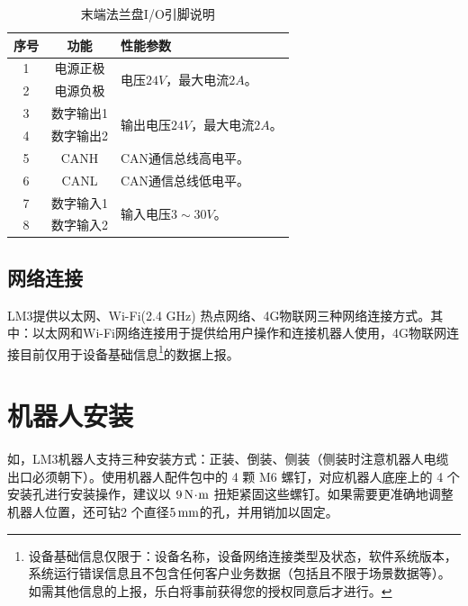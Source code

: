 \begin{enumerate}
\begin{table}[ht]
    \centering\small
\begin{tabular}{|c|c|l|}\hline
   \sf 序号	&  \sf 功能	& \sf  性能参数\\\hline
    1	&   电源正极   &  \multirow{2}{5cm}{
            电压$24\unit{V}$，最大电流$2\unit{A}$。
    }\\\cline{1-2}
    2	&   电源负极 & \\\hline
    3	&   数字输出1	&   \multirow{2}{5cm}{输出电压$24\unit{V}$，最大电流$2\unit{A}$。}\\\cline{1-2}
    4	&   数字输出2	&   \\\hline
    5	&   CANH	&  CAN通信总线高电平。 \\\hline
    6	&   CANL	& CAN通信总线低电平。  \\\hline
    7	&   数字输入1	&   \multirow{2}{5cm}{
            输入电压$3\sim 30\unit{V}$。
    }\\\cline{1-2}
    8	&   数字输入2	&   \\\hline
\end{tabular}
\caption{末端法兰盘I/O引脚说明}
\label{tab:法兰盘IO}
\end{table}

\end{enumerate}

\subsection{网络连接}

LM3提供以太网、Wi-Fi(2.4 GHz) 热点网络、4G物联网三种网络连接方式。其中：以太网和Wi-Fi网络连接用于提供给用户操作和连接机器人使用，4G物联网连接目前仅用于设备基础信息\footnote{设备基础信息仅限于：设备名称，设备网络连接类型及状态，软件系统版本，系统运行错误信息且不包含任何客户业务数据（包括且不限于场景数据等）。如需其他信息的上报，乐白将事前获得您的授权同意后才进行。}的数据上报。

\section{机器人安装}

如，LM3机器人支持三种安装方式：正装、倒装、侧装（侧装时注意机器人电缆出口必须朝下）。使用机器人配件包中的 4 颗 M6 螺钉，对应机器人底座上的 4 个安装孔进行安装操作，建议以 $9\,\mathrm{N\!\cdot\! m}$ 扭矩紧固这些螺钉。如果需要更准确地调整机器人位置，还可钻2 个直径$5 \,\mathrm{mm}$的孔，并用销加以固定。

